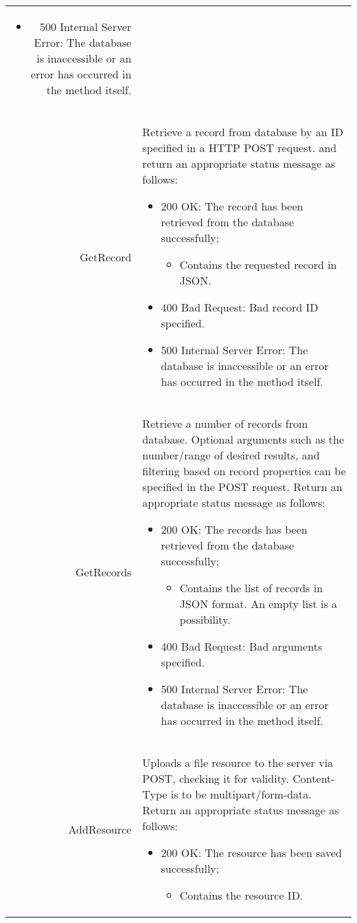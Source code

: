\begin{longtable}{r p{10cm}}
\begin{itemize}
		\item 500 Internal Server Error: The database is inaccessible or an error has occurred in the method itself.
	\end{itemize}\\
	GetRecord & Retrieve a record from database by an ID specified in a HTTP POST request.  and return an appropriate status message as follows:
	\begin{itemize}
		\item 200 OK: The record has been retrieved from the database successfully; 
		\begin{itemize}
			\item Contains the requested record in JSON.
		\end{itemize}
		\item 400 Bad Request: Bad record ID specified.
		\item 500 Internal Server Error: The database is inaccessible or an error has occurred in the method itself.
	\end{itemize}\\
	GetRecords & Retrieve a number of records from database. Optional arguments such as the number/range of desired results, and filtering based on record properties can be specified in the POST request. Return an appropriate status message as follows:
	\begin{itemize}
		\item 200 OK: The records has been retrieved from the database successfully; 
		\begin{itemize}
			\item Contains the list of records in JSON format. An empty list is a possibility.
		\end{itemize}
		\item 400 Bad Request: Bad arguments specified.
		\item 500 Internal Server Error: The database is inaccessible or an error has occurred in the method itself.
	\end{itemize}\\
	AddResource & Uploads a file resource to the server via POST, checking it for validity. Content-Type is to be multipart/form-data. Return an appropriate status message as follows:
	\begin{itemize}
		\item 200 OK: The resource has been saved successfully; 
		\begin{itemize}
			\item Contains the resource ID.
		\end{itemize}

\end{itemize}
\end{longtable}
